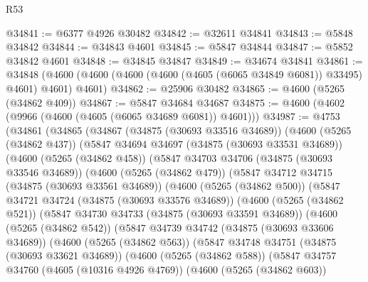 \begin{lexlean}{R53}
\begin{coremodule}
@34841 := @6377 @4926 @30482
@34842 := @32611 @34841
@34843 := @5848 @34842
@34844 := @34843 @4601
@34845 := @5847 @34844
@34847 := @5852 @34842 @4601
@34848 := @34845 @34847
@34849 := @34674 @34841
@34861 := @34848
    (@4600 (@4600 (@4600 (@4600 (@4605 (@6065 @34849 @6081)) @33495) @4601) @4601) @4601)
@34862 := @25906 @30482
@34865 := @4600 (@5265 (@34862 @409))
@34867 := @5847 @34684 @34687
@34875 := @4600 (@4602 (@9966 (@4600 (@4605 (@6065 @34689 @6081)) @4601)))
@34987 := @4753
    (@34861
      (@34865
        (@34867
          (@34875 (@30693 @33516 @34689))
          (@4600
            (@5265 (@34862 @437))
            (@5847
              @34694
              @34697
              (@34875 (@30693 @33531 @34689))
              (@4600
                (@5265 (@34862 @458))
                (@5847
                  @34703
                  @34706
                  (@34875 (@30693 @33546 @34689))
                  (@4600
                    (@5265 (@34862 @479))
                    (@5847
                      @34712
                      @34715
                      (@34875 (@30693 @33561 @34689))
                      (@4600
                        (@5265 (@34862 @500))
                        (@5847
                          @34721
                          @34724
                          (@34875 (@30693 @33576 @34689))
                          (@4600
                            (@5265 (@34862 @521))
                            (@5847
                              @34730
                              @34733
                              (@34875 (@30693 @33591 @34689))
                              (@4600
                                (@5265 (@34862 @542))
                                (@5847
                                  @34739
                                  @34742
                                  (@34875 (@30693 @33606 @34689))
                                  (@4600
                                    (@5265 (@34862 @563))
                                    (@5847
                                      @34748
                                      @34751
                                      (@34875 (@30693 @33621 @34689))
                                      (@4600
                                        (@5265 (@34862 @588))
                                        (@5847
                                          @34757
                                          @34760
                                          (@4605 (@10316 @4926 @4769))
                                          (@4600
                                            (@5265 (@34862 @603))

\end{coremodule}
\end{lexlean}
